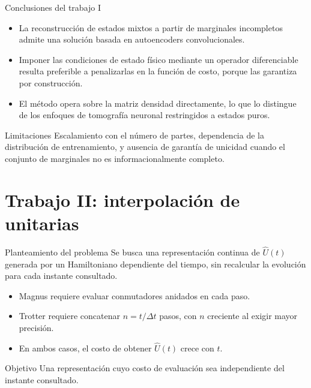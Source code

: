 \documentclass[10pt,aspectratio=169]{beamer}
\newcommand{\Uop}{\hat{U}}
\begin{document}
\begin{frame}{Conclusiones del trabajo I}
  \begin{itemize}
    \item La reconstrucción de estados mixtos a partir de marginales incompletos admite una solución basada en autoencoders convolucionales.
    \pause
    \item Imponer las condiciones de estado físico mediante un operador diferenciable resulta preferible a penalizarlas en la función de costo, porque las garantiza por construcción. %
    \pause
    \item El método opera sobre la matriz densidad directamente, lo que lo distingue de los enfoques de tomografía neuronal restringidos a estados puros.
  \end{itemize}
  \vfill
  \pause
  \begin{block}{Limitaciones}
    Escalamiento con el número de partes, dependencia de la distribución de entrenamiento, y ausencia de garantía de unicidad cuando el conjunto de marginales no es informacionalmente completo.
  \end{block}
\end{frame}

\section{Trabajo II: interpolación de unitarias}

\begin{frame}{Planteamiento del problema}
  Se busca una representación continua de $\Uop(t)$ generada por un Hamiltoniano dependiente del tiempo, sin recalcular la evolución para cada instante consultado.
  \pause
  \vfill
  \begin{itemize}
    \item Magnus requiere evaluar conmutadores anidados en cada paso.
    \item Trotter requiere concatenar $n = t/\Delta t$ pasos, con $n$ creciente al exigir mayor precisión.
    \item En ambos casos, el costo de obtener $\Uop(t)$ crece con $t$.
  \end{itemize}
  \pause
  \vfill
  \begin{block}{Objetivo}
    Una representación cuyo costo de evaluación sea independiente del instante consultado.
  \end{block}
\end{frame}
\end{document}
